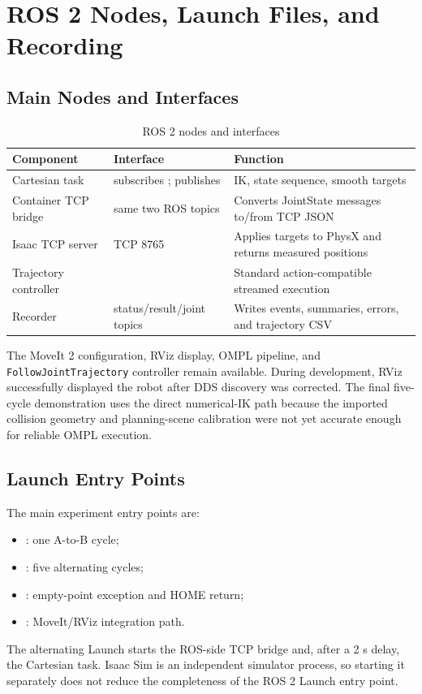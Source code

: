 \documentclass[UTF8,zihao=-4,scheme=chinese,fontset=none]{ctexart}
\begin{document}
\section{ROS 2 Nodes, Launch Files, and Recording}
\subsection{Main Nodes and Interfaces}
\begin{table}[H]\centering\caption{ROS 2 nodes and interfaces}
\begin{tabularx}{\textwidth}{p{4.0cm}p{4.0cm}Y}\toprule Component & Interface & Function\\\midrule
Cartesian task & subscribes ; publishes  & IK, state sequence, smooth targets\\
Container TCP bridge & same two ROS topics & Converts JointState messages to/from TCP JSON\\
Isaac TCP server & TCP 8765 & Applies targets to PhysX and returns measured positions\\
Trajectory controller &  & Standard action-compatible streamed execution\\
Recorder & status/result/joint topics & Writes events, summaries, errors, and trajectory CSV\\
\bottomrule\end{tabularx}
\end{table}
The MoveIt 2 configuration, RViz display, OMPL pipeline, and \texttt{FollowJointTrajectory} controller remain available. During development, RViz successfully displayed the robot after DDS discovery was corrected. The final five-cycle demonstration uses the direct numerical-IK path because the imported collision geometry and planning-scene calibration were not yet accurate enough for reliable OMPL execution.

\subsection{Launch Entry Points}
The main experiment entry points are:
\begin{itemize}
\item {}: one A-to-B cycle;
\item {}: five alternating cycles;
\item {}: empty-point exception and HOME return;
\item {}: MoveIt/RViz integration path.
\end{itemize}
The alternating Launch starts the ROS-side TCP bridge and, after a 2 s delay, the Cartesian task. Isaac Sim is an independent simulator process, so starting it separately does not reduce the completeness of the ROS 2 Launch entry point.
\end{document}
